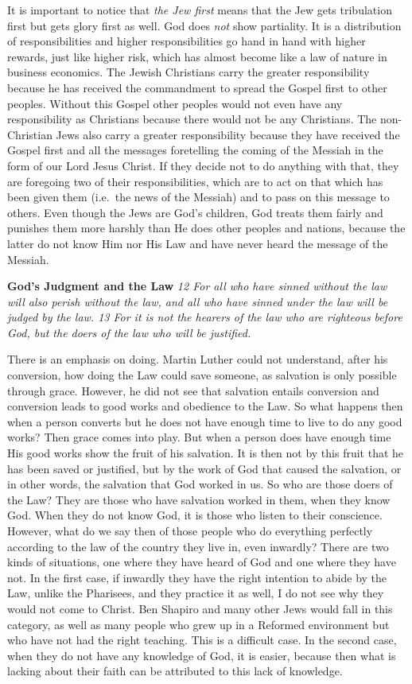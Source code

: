 It is important to notice that \emph{the Jew first} means that the Jew
gets tribulation first but gets glory first as well. God does \emph{not}
show partiality. It is a distribution of responsibilities and higher
responsibilities go hand in hand with higher rewards, just like higher
risk, which has almost become like a law of nature in business
economics. The Jewish Christians carry the greater responsibility
because he has received the commandment to spread the Gospel first to
other peoples. Without this Gospel other peoples would not even have any
responsibility as Christians because there would not be any Christians.
The non-Christian Jews also carry a greater responsibility because they
have received the Gospel first and all the messages foretelling the
coming of the Messiah in the form of our Lord Jesus Christ. If they
decide not to do anything with that, they are foregoing two of their
responsibilities, which are to act on that which has been given them
(i.e.~the news of the Messiah) and to pass on this message to others.
Even though the Jews are God's children, God treats them fairly and
punishes them more harshly than He does other peoples and nations,
because the latter do not know Him nor His Law and have never heard the
message of the Messiah.

\textbf{God's Judgment and the Law} \emph{12 For all who have sinned
without the law will also perish without the law, and all who have
sinned under the law will be judged by the law. 13 For it is not the
hearers of the law who are righteous before God, but the doers of the
law who will be justified.}

There is an emphasis on doing. Martin Luther could not understand, after
his conversion, how doing the Law could save someone, as salvation is
only possible through grace. However, he did not see that salvation
entails conversion and conversion leads to good works and obedience to
the Law. So what happens then when a person converts but he does not
have enough time to live to do any good works? Then grace comes into
play. But when a person does have enough time His good works show the
fruit of his salvation. It is then not by this fruit that he has been
saved or justified, but by the work of God that caused the salvation, or
in other words, the salvation that God worked in us. So who are those
doers of the Law? They are those who have salvation worked in them, when
they know God. When they do not know God, it is those who listen to
their conscience. However, what do we say then of those people who do
everything perfectly according to the law of the country they live in,
even inwardly? There are two kinds of situations, one where they have
heard of God and one where they have not. In the first case, if inwardly
they have the right intention to abide by the Law, unlike the Pharisees,
and they practice it as well, I do not see why they would not come to
Christ. Ben Shapiro and many other Jews would fall in this category, as
well as many people who grew up in a Reformed environment but who have
not had the right teaching. This is a difficult case. In the second
case, when they do not have any knowledge of God, it is easier, because
then what is lacking about their faith can be attributed to this lack of
knowledge.

